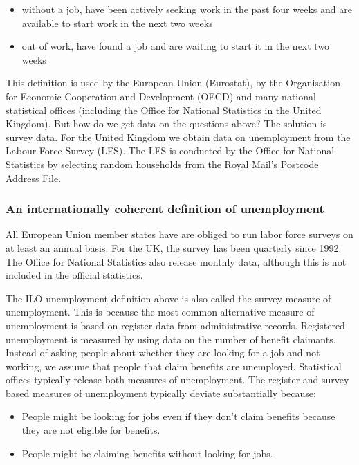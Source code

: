 \documentclass[]{book}
\providecommand{\tightlist}{%
  \setlength{\itemsep}{0pt}\setlength{\parskip}{0pt}}
\begin{document}
\begin{itemize}
\tightlist
\item
  without a job, have been actively seeking work in the past four weeks and are available to start work in the next two weeks
\item
  out of work, have found a job and are waiting to start it in the next two weeks
\end{itemize}

This definition is used by the European Union (Eurostat), by the Organisation for Economic Cooperation and Development (OECD) and many national statistical offices (including the Office for National Statistics in the United Kingdom). But how do we get data on the questions above? The solution is survey data. For the United Kingdom we obtain data on unemployment from the Labour Force Survey (LFS). The LFS is conducted by the Office for National Statistics by selecting random households from the Royal Mail's Postcode Address File.

\hypertarget{an-internationally-coherent-definition-of-unemployment}{%
\subsubsection{An internationally coherent definition of unemployment}\label{an-internationally-coherent-definition-of-unemployment}}

All European Union member states have are obliged to run labor force surveys on at least an annual basis. For the UK, the survey has been quarterly since 1992. The Office for National Statistics also release monthly data, although this is not included in the official statistics.

The ILO unemployment definition above is also called the survey measure of unemployment. This is because the most common alternative measure of unemployment is based on register data from administrative records. Registered unemployment is measured by using data on the number of benefit claimants. Instead of asking people about whether they are looking for a job and not working, we assume that people that claim benefits are unemployed. Statistical offices typically release both measures of unemployment. The register and survey based measures of unemployment typically deviate substantially because:

\begin{itemize}
\tightlist
\item
  People might be looking for jobs even if they don't claim benefits because they are not eligible for benefits.
\item
  People might be claiming benefits without looking for jobs.
\end{itemize}
\end{document}
